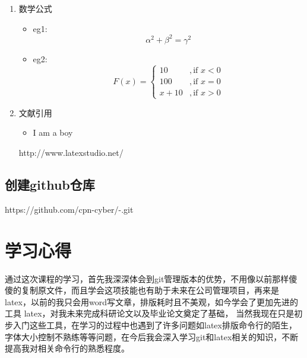 \documentclass[a4paper, 12pt]{article}
\begin{document}
\begin{enumerate}
\begin{itemize}
      \end{itemize}
      \item {\large 数学公式}
      \begin{itemize}
        \item eg1:
        \begin{equation}
        \alpha^2+\beta^2=\gamma^2
      \end{equation}
      \item eg2:
      \begin{equation}
        F(x)=
        \begin{cases}
        10&,\text{if $x<0$}\\
        100&,\text{if $x=0$}\\
        x+10&,\text{if $x>0$}
        \end{cases}
      \end{equation}
      \end{itemize}
      \item{\large 文献引用}
      \begin{itemize}
        \item I am a boy\cite{1}
      \end{itemize}
      \begin{thebibliography}{99}
         {http://www.latexstudio.net/}
      \end{thebibliography}
    \end{enumerate}
    \subsection{创建github仓库}
    https://github.com/cpn-cyber/-.git
    \section{学习心得}
    通过这次课程的学习，首先我深深体会到git管理版本的优势，不用像以前那样傻傻的复制原文件，而且学会这项技能也有助于未来在公司管理项目，再来是latex，以前的我只会用word写文章，排版耗时且不美观，如今学会了更加先进的工具 latex，对我未来完成科研论文以及毕业论文奠定了基础，
    当然我现在只是初步入门这些工具，在学习的过程中也遇到了许多问题如latex排版命令行的陌生，字体大小控制不熟练等等问题，在今后我会深入学习git和latex相关的知识，不断提高我对相关命令行的熟悉程度。
\end{document}
